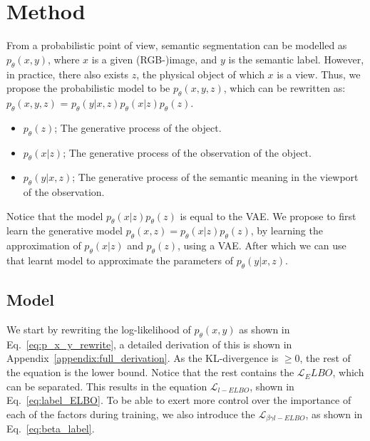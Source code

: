 \chapter{Method}\label{chapter:first_real_chapter}
From a probabilistic point of view, semantic segmentation can be modelled as $p_\theta(x,y)$, where $x$ is a given (RGB-)image, and $y$ is the semantic label. However, in practice, there also exists $z$, the physical object of which $x$ is a view. Thus, we propose the probabilistic model to be $p_\theta(x,y,z)$, which can be rewritten as: $p_\theta(x,y,z)$ = $p_\theta(y|x,z) p_\theta(x|z) p_\theta(z)$.
\begin{itemize}
    \item $p_\theta(z)$; The generative process of the object.
    \item $p_\theta(x|z)$; The generative process of the observation of the object.
    \item $p_\theta(y|x,z)$; The generative process of the semantic meaning in the viewport of the observation.
\end{itemize}
Notice that the model $p_\theta(x|z) p_\theta(z)$ is equal to the VAE. We propose to first learn the generative model $p_\theta(x,z) = p_\theta(x|z) p_\theta(z)$, by learning the approximation of $p_\theta(x|z)$ and $p_\theta(z)$, using a VAE. After which we can use that learnt model to approximate the parameters of $p_\theta(y|x,z)$.

\section{Model}
We start by rewriting the log-likelihood of $p_\theta(x, y)$ as shown in Eq.~\ref{eq:p_x_y_rewrite}, a detailed derivation of this is shown in Appendix~\ref{appendix:full_derivation}. As the KL-divergence is $\geq 0$, the rest of the equation is the lower bound. Notice that the rest contains the $\mathcal{L}_ELBO$, which can be separated. This results in the equation $\mathcal{L}_{l-ELBO}$, shown in Eq.~\ref{eq:label_ELBO}. To be able to exert more control over the importance of each of the factors during training, we also introduce the $\mathcal{L}_{\beta\gamma l-ELBO}$, as shown in Eq.~\ref{eq:beta_label}.

